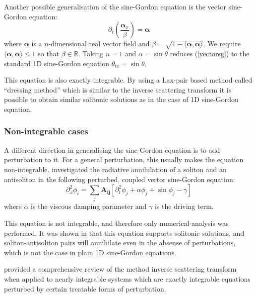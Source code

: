 \documentclass{report}
\begin{document}
\medbreak
Another possible generalisation of the sine-Gordon equation is the vector sine-Gordon equation:
\begin{equation}\label{vectorsg}
  \partial_t\left(\frac{\bm{\alpha}_x}{\beta}\right) = \bm{\alpha}
\end{equation}
where $\bm{\alpha}$ is a $n$-dimensional real vector field and $\beta = \sqrt{1 - \langle\bm{\alpha},\bm{\alpha}\rangle}$. We require $\langle\bm{\alpha},\bm{\alpha}\rangle\le1$ so that $\beta\in\mathbb{R}$. Taking $n=1$ and $\alpha = \sin \theta$ reduces (\ref{vectorsg}) to the standard 1D sine-Gordon equation $\theta_{tx} = \sin \theta$.

This equation is also exactly integrable. By using a Lax-pair based method called ``dressing method'' which is similar to the inverse scattering transform \cite{Mikhailov201653} it is possible to obtain similar solitonic solutions as in the case of 1D sine-Gordon equation.

\subsubsection{Non-integrable cases}
A different direction in generalising the sine-Gordon equation is to add perturbation to it. For a general perturbation, this usually makes the equation non-integrable. \cite{PhysRevB.85.134525} investigated the radiative annihilation of a soliton and an antisoliton in the following perturbed, coupled vertor sine-Gordon equation:
\begin{equation}
  \partial^2_x\phi_i=\sum_j \mathbf{A_{ij}} \left[\partial^2_t \phi_j +\alpha \phi_j +\sin \phi_j - \gamma\right]
\end{equation}
where $\alpha$ is the viscous damping parameter and $\gamma$ is the driving term.

This equation is not integrable, and therefore only numerical analysis was performed. It was shown in \cite{PhysRevB.85.134525} that this equation supports solitonic solutions, and soliton-antisoliton pairs will annihilate even in the absense of perturbations, which is not the case in plain 1D sine-Gordon equations.

\cite{RevModPhys.61.763} provided a comprehensive review of the method inverse scattering transform when applied to nearly integrable systems which are exactly integrable equations perturbed by certain treatable forms of perturbation.

\medbreak
\end{document}
